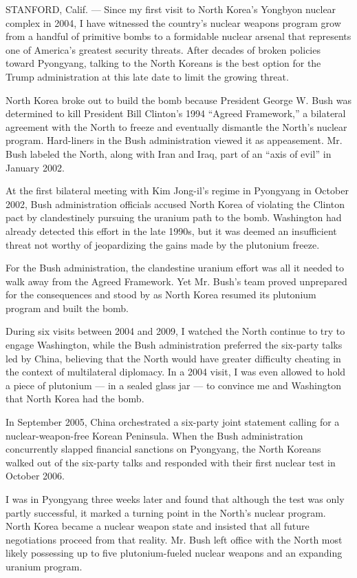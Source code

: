 STANFORD, Calif. --- Since my first visit to North Korea's Yongbyon
nuclear complex in 2004, I have witnessed the country's nuclear weapons
program grow from a handful of primitive bombs to a formidable nuclear
arsenal that represents one of America's greatest security threats.
After decades of broken policies toward Pyongyang, talking to the North
Koreans is the best option for the Trump administration at this late
date to limit the growing threat.

North Korea broke out to build the bomb because President George W. Bush
was determined to kill President Bill Clinton's 1994 ``Agreed
Framework,'' a bilateral agreement with the North to freeze and
eventually dismantle the North's nuclear program. Hard-liners in the
Bush administration viewed it as appeasement. Mr. Bush labeled the
North, along with Iran and Iraq, part of an ``axis of evil'' in January
2002.

At the first bilateral meeting with Kim Jong-il's regime in Pyongyang in
October 2002, Bush administration officials accused North Korea of
violating the Clinton pact by clandestinely pursuing the uranium path to
the bomb. Washington had already detected this effort in the late 1990s,
but it was deemed an insufficient threat not worthy of jeopardizing the
gains made by the plutonium freeze.

For the Bush administration, the clandestine uranium effort was all it
needed to walk away from the Agreed Framework. Yet Mr. Bush's team
proved unprepared for the consequences and stood by as North Korea
resumed its plutonium program and built the bomb.

During six visits between 2004 and 2009, I watched the North continue to
try to engage Washington, while the Bush administration preferred the
six-party talks led by China, believing that the North would have
greater difficulty cheating in the context of multilateral diplomacy. In
a 2004 visit, I was even allowed to hold a piece of plutonium --- in a
sealed glass jar --- to convince me and Washington that North Korea had
the bomb.

In September 2005, China orchestrated a six-party joint statement
calling for a nuclear-weapon-free Korean Peninsula. When the Bush
administration concurrently slapped financial sanctions on Pyongyang,
the North Koreans walked out of the six-party talks and responded with
their first nuclear test in October 2006.

I was in Pyongyang three weeks later and found that although the test
was only partly successful, it marked a turning point in the North's
nuclear program. North Korea became a nuclear weapon state and insisted
that all future negotiations proceed from that reality. Mr. Bush left
office with the North most likely possessing up to five plutonium-fueled
nuclear weapons and an expanding uranium program.

